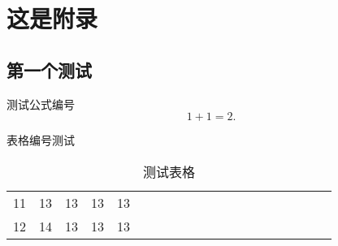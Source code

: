 
\appendix

\chapter{这是附录}

\section{第一个测试}
测试公式编号
\begin{equation}
  1+1=2.
\end{equation}

表格编号测试

\begin{table}[h]
  \centering
  \caption{测试表格}
  \begin{tabular}{*{20}c}
    \hline
    11 & 13  & 13  & 13  & 13 \\
    12 & 14  & 13  & 13  & 13 \\
    \hline
  \end{tabular}
\end{table}